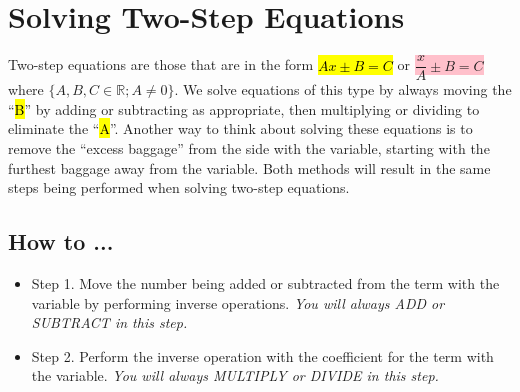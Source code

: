 \section{Solving Two-Step Equations}
Two-step equations are those that are in the form \hl{$Ax\pm B = C$} or \colorbox{pink}{$\dfrac{x}{A}\pm B=C$} where $\{A,B,C \in \mathbb{R}; A\neq 0\}$. We solve equations of this type by always moving the ``\hl{B}'' by adding or subtracting as appropriate, then multiplying or dividing to eliminate the ``\hl{A}''. Another way to think about solving these equations is to remove the ``excess baggage'' from the side with the variable, starting with the furthest baggage away from the variable. Both methods will result in the same steps being performed when solving two-step equations.

\subsection{How to ...}
\begin{itemize}
    \item Step 1. Move the number being added or subtracted from the term with the variable by performing inverse operations. \emph{You will always ADD or SUBTRACT in this step.}
    \item Step 2. Perform the inverse operation with the coefficient for the term with the variable. \emph{You will always MULTIPLY or DIVIDE in this step.}
\end{itemize}
